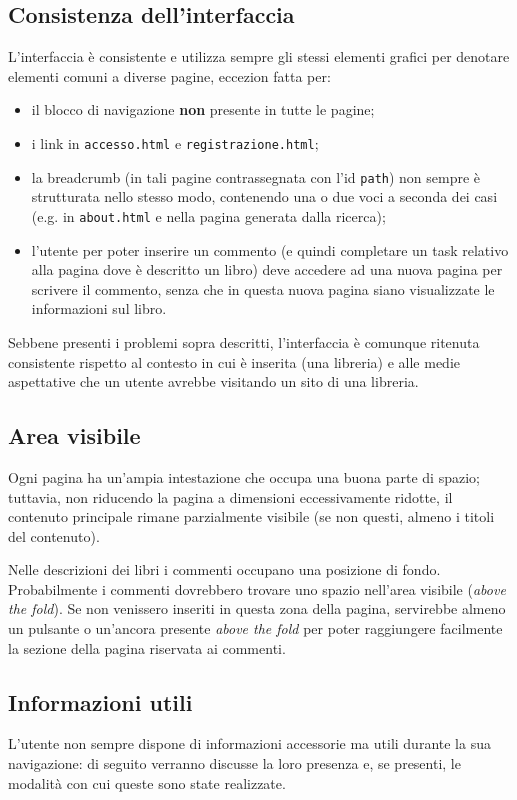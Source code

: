 \subsection{Consistenza dell'interfaccia}
L'interfaccia è consistente e utilizza sempre gli stessi elementi grafici per
denotare elementi comuni a diverse pagine, eccezion fatta per:
\begin{itemize}
\item il blocco di navigazione \textbf{non} presente in tutte le pagine;
\item i link in \texttt{accesso.html} e \texttt{registrazione.html};
\item la breadcrumb (in tali pagine contrassegnata con l'id \texttt{path}) non
sempre è strutturata nello stesso modo, contenendo una o due voci a seconda
dei casi (e.g. in \texttt{about.html} e nella pagina generata dalla ricerca);
\item l'utente per poter inserire un commento (e quindi completare un task
relativo alla pagina dove è descritto un libro) deve accedere ad una nuova
pagina per scrivere il commento, senza che in questa nuova pagina siano
visualizzate le informazioni sul libro.
\end{itemize}

Sebbene presenti i problemi sopra descritti, l'interfaccia è comunque ritenuta
consistente rispetto al contesto in cui è inserita (una libreria) e alle
medie aspettative che un utente avrebbe visitando un sito di una libreria.

\subsection{Area visibile}
Ogni pagina ha un'ampia intestazione che occupa una buona parte di spazio;
tuttavia, non riducendo la pagina a dimensioni eccessivamente ridotte, il
contenuto principale rimane parzialmente visibile (se non questi, almeno i
titoli del contenuto).

Nelle descrizioni dei libri i commenti occupano una posizione di fondo.
Probabilmente i commenti dovrebbero trovare uno spazio nell'area visibile
(\textit{above the fold}). Se non venissero inseriti in questa zona della
pagina, servirebbe almeno un pulsante o un'ancora presente \textit{above the
fold} per poter raggiungere facilmente la sezione della pagina riservata ai
commenti.

\subsection{Informazioni utili}
L'utente non sempre dispone di informazioni accessorie ma utili durante la sua
navigazione: di seguito verranno discusse la loro presenza e, se presenti, le
modalità con cui queste sono state realizzate.

